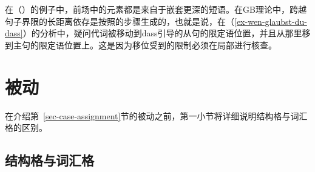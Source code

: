 在（）的例子中，前场中的元素都是来自于嵌套更深的短语。在GB理论中，跨越句子界限的长距离依存是按照\citep[--79]{Grewendorf88a}的步骤生成的，也就是说，在（\ref{ex-wen-glaubst-du-dass}）的分析中，疑问代词被移动到dass引导的从句的限定语位置，并且从那里移到主句的限定语位置上。这是因为移位受到的限制必须在局部进行核查。

\section{被动}
\label{Abschnitt-GB-Passiv}\label{sec-passive-gb}

在介绍第~\ref{sec-case-assignment}节的被动之前，第一小节将详细说明结构格与词汇格的区别。

\subsection{结构格与词汇格}
\label{Abschnitt-struktureller-Kasus}

